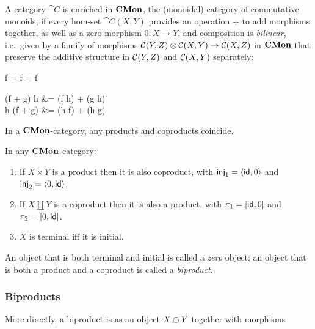 A category $\cat{C}$ is enriched in $\mathbf{CMon}$, the (monoidal) category of commutative monoids, if every hom-set
$\cat{C}(X,Y)$ provides an operation + to add morphisms together, as well as a zero morphism $0: X \to Y$, and
composition is \emph{bilinear}, i.e.~given by a family of morphisms ${\mathcal{C}}(Y,Z) \otimes
{\mathcal{C}}(X,Y) \to {\mathcal{C}}(X,Z)$ in $\mathbf{CMon}$ that preserve the additive structure in
${\mathcal{C}}(Y,Z)$ and ${\mathcal{C}}(X,Y)$ separately:

\begin{salign*}
f \comp \zero = f = \zero \comp f
\end{salign*}
\begin{salign*}
(f + g) \comp h &= (f \comp h) + (g \comp h) \\
h \comp (f + g) &= (h \comp f) + (h \comp g)
\end{salign*}

In a $\mathbf{CMon}$-category, any products and coproducts coincide.

\begin{proposition}
\label{prop:biproducts:from-product-or-coproduct}
In any $\mathbf{CMon}$-category:
\begin{enumerate}
\item If $X \times Y$ is a product then it is also coproduct, with $\mathsf{inj}_1 = \langle \mathsf{id}, 0\rangle$ and $\mathsf{inj}_2 =
\langle 0, \mathsf{id}\rangle$.
\item If $X \coprod Y$ is a coproduct then it is also a product, with $\pi_1 = [\mathsf{id}, 0]$ and $\pi_2 =
[0, \mathsf{id}]$.
\item $X$ is terminal iff it is initial.
\end{enumerate}
\end{proposition}

An object that is both terminal and initial is called a \emph{zero} object; an object that is both a product
and a coproduct is called a \emph{biproduct}.

\subsubsection{Biproducts}

More directly, a biproduct is as an object $X \oplus Y$ together with morphisms

\begin{center}
\end{center}


